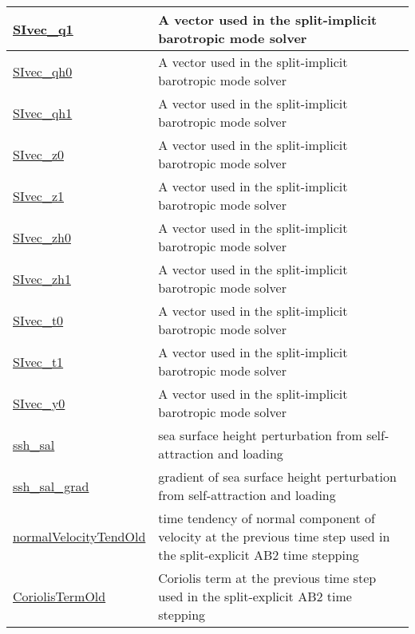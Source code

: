 {\begin{center}
\begin{longtable}{| p{2.0in} | p{4.0in} |}
    \hline
    \hyperref[subsec:var_sec_diagnostics_SIvec_q1]{SIvec\_q1} & A vector used in the split-implicit barotropic mode solver \\
    \hline
    \hyperref[subsec:var_sec_diagnostics_SIvec_qh0]{SIvec\_qh0} & A vector used in the split-implicit barotropic mode solver \\
    \hline
    \hyperref[subsec:var_sec_diagnostics_SIvec_qh1]{SIvec\_qh1} & A vector used in the split-implicit barotropic mode solver \\
    \hline
    \hyperref[subsec:var_sec_diagnostics_SIvec_z0]{SIvec\_z0} & A vector used in the split-implicit barotropic mode solver \\
    \hline
    \hyperref[subsec:var_sec_diagnostics_SIvec_z1]{SIvec\_z1} & A vector used in the split-implicit barotropic mode solver \\
    \hline
    \hyperref[subsec:var_sec_diagnostics_SIvec_zh0]{SIvec\_zh0} & A vector used in the split-implicit barotropic mode solver \\
    \hline
    \hyperref[subsec:var_sec_diagnostics_SIvec_zh1]{SIvec\_zh1} & A vector used in the split-implicit barotropic mode solver \\
    \hline
    \hyperref[subsec:var_sec_diagnostics_SIvec_t0]{SIvec\_t0} & A vector used in the split-implicit barotropic mode solver \\
    \hline
    \hyperref[subsec:var_sec_diagnostics_SIvec_t1]{SIvec\_t1} & A vector used in the split-implicit barotropic mode solver \\
    \hline
    \hyperref[subsec:var_sec_diagnostics_SIvec_y0]{SIvec\_y0} & A vector used in the split-implicit barotropic mode solver \\
    \hline
    \hyperref[subsec:var_sec_diagnostics_ssh_sal]{ssh\_sal} & sea surface height perturbation from self-attraction and loading \\
    \hline
    \hyperref[subsec:var_sec_diagnostics_ssh_sal_grad]{ssh\_sal\_grad} & gradient of sea surface height perturbation from self-attraction and loading \\
    \hline
    \hyperref[subsec:var_sec_diagnostics_normalVelocityTendOld]{normalVelocityTendOld} & time tendency of normal component of velocity at the previous time step used in the split-explicit AB2 time stepping \\
    \hline
    \hyperref[subsec:var_sec_diagnostics_CoriolisTermOld]{CoriolisTermOld} & Coriolis term at the previous time step used in the split-explicit AB2 time stepping \\
    \hline
\end{longtable}
\end{center}
}
